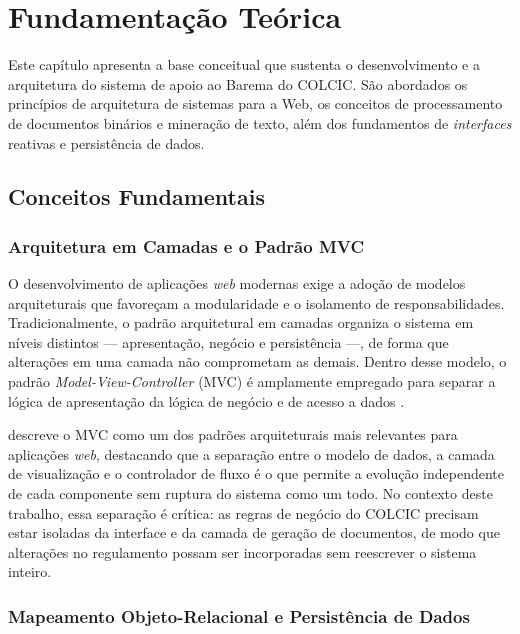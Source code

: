 \chapter{Fundamentação Teórica}
\label{cap:fundamentacao}

Este capítulo apresenta a base conceitual que sustenta o desenvolvimento e a arquitetura do sistema de apoio ao Barema do COLCIC. São abordados os princípios de arquitetura de sistemas para a Web, os conceitos de processamento de documentos binários e mineração de texto, além dos fundamentos de \textit{interfaces} reativas e persistência de dados.

\section{Conceitos Fundamentais}


\subsection{Arquitetura em Camadas e o Padrão MVC}

O desenvolvimento de aplicações \textit{web} modernas exige a adoção de modelos arquiteturais que favoreçam a modularidade e o isolamento de responsabilidades. Tradicionalmente, o padrão arquitetural em camadas organiza o sistema em níveis distintos — apresentação, negócio e persistência —, de forma que alterações em uma camada não comprometam as demais. Dentro desse modelo,  o padrão \textit{Model-View-Controller} (MVC) é amplamente empregado para separar a lógica de apresentação da lógica de negócio e de acesso a dados \cite{pressman2016}.

 descreve o MVC como um dos padrões arquiteturais mais relevantes para aplicações \textit{web}, destacando que a separação entre o modelo de dados, a camada de visualização e o controlador de fluxo é o que permite a 
evolução independente de cada componente sem ruptura do sistema como um todo. No contexto deste trabalho, essa separação é crítica: as regras de negócio do COLCIC precisam estar isoladas da 
interface e da camada de geração de documentos, de modo que alterações no regulamento possam ser incorporadas sem reescrever o sistema inteiro.


\subsection{Mapeamento Objeto-Relacional e Persistência de Dados}

